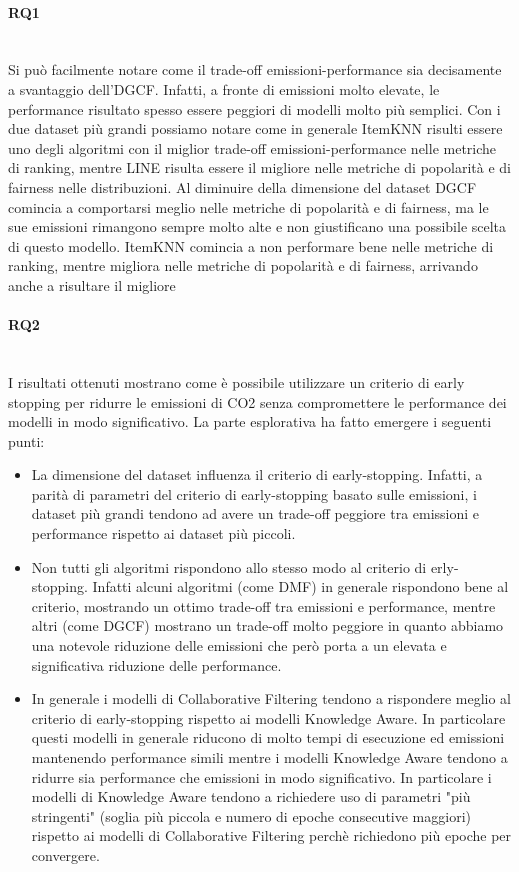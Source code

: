\paragraph*{RQ1} \textcolor{white}{.}\\
Si può facilmente notare come il trade-off emissioni-performance sia decisamente a svantaggio dell'DGCF. Infatti, a fronte di emissioni molto elevate, le performance risultato spesso essere peggiori di modelli molto più semplici.
Con i due dataset più grandi possiamo notare come in generale ItemKNN risulti essere uno degli algoritmi con il miglior trade-off emissioni-performance nelle metriche di ranking, mentre LINE risulta essere il migliore nelle metriche di popolarità e di fairness nelle distribuzioni.
Al diminuire della dimensione del dataset DGCF comincia a comportarsi meglio nelle metriche di popolarità e di fairness, ma le sue emissioni rimangono sempre molto alte e non giustificano una possibile scelta di questo modello.
ItemKNN comincia a non performare bene nelle metriche di ranking, mentre migliora nelle metriche di popolarità e di fairness, arrivando anche a risultare il migliore

\paragraph*{RQ2} \textcolor{white}{.}\\
I risultati ottenuti mostrano come è possibile utilizzare un criterio di early stopping per ridurre le emissioni di CO2 senza compromettere le performance dei modelli in modo significativo. La parte esplorativa ha fatto emergere i seguenti punti:
\begin{itemize}
    \item La dimensione del dataset influenza il criterio di early-stopping. Infatti, a parità di parametri del criterio di early-stopping basato sulle emissioni, i dataset più grandi tendono ad avere un trade-off peggiore tra emissioni e performance rispetto ai dataset più piccoli.
    \item Non tutti gli algoritmi rispondono allo stesso modo al criterio di erly-stopping. Infatti alcuni algoritmi (come DMF) in generale rispondono bene al criterio, mostrando un ottimo trade-off tra emissioni e performance, mentre altri (come DGCF) mostrano un trade-off molto peggiore in quanto abbiamo una notevole riduzione delle emissioni che però porta a un elevata e significativa riduzione delle performance.
    \item In generale i modelli di Collaborative Filtering tendono a rispondere meglio al criterio di early-stopping rispetto ai modelli Knowledge Aware. In particolare questi modelli in generale riducono di molto tempi di esecuzione ed emissioni mantenendo performance simili mentre i modelli Knowledge Aware tendono a ridurre sia performance che emissioni in modo significativo. In particolare i modelli di Knowledge Aware tendono a richiedere uso di parametri "più stringenti" (soglia più piccola e numero di epoche consecutive maggiori) rispetto ai modelli di Collaborative Filtering perchè richiedono più epoche per convergere.
\end{itemize}

